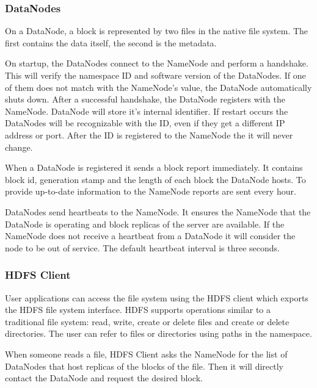 \subsubsection*{DataNodes \cite{Shvachko:2010:HDF:1913798.1914427}}
On a DataNode, a block is represented by two files in the native file system. The first contains the data itself, the second is the metadata.

On startup, the DataNodes connect to the NameNode and perform a handshake. This will verify the namespace ID and software version of the DataNodes. If one of them does not match with the NameNode's value, the DataNode automatically shuts down. After a successful handshake, the DataNode registers with the NameNode. DataNode will store it's internal identifier. If restart occurs the DataNodes will be recognizable with the ID, even if they get a different IP address or port. After the ID is registered to the NameNode the it will never change. 

 When a DataNode is registered it sends a block report immediately. It contains block id, generation stamp and the length of each block the DataNode hosts. To provide up-to-date information to the NameNode reports are sent every hour. 

DataNodes send heartbeats to the NameNode. It ensures the NameNode that the DataNode is operating and block replicas of the server are available. If the NameNode does not receive a heartbeat from a DataNode it will consider the node to be out of service. The default heartbeat interval is three seconds.

\subsubsection*{HDFS Client \cite{Shvachko:2010:HDF:1913798.1914427}}
User applications can access the file system using the HDFS client which exports the HDFS file system interface. HDFS supports operations similar to a traditional file system: read, write, create or delete files and create or delete directories. The user can refer to files or directories using paths in the namespace.

When someone reads a file, HDFS Client asks the NameNode for the list of DataNodes that host replicas of the blocks of the file. Then it will directly contact the DataNode and request the desired block.

